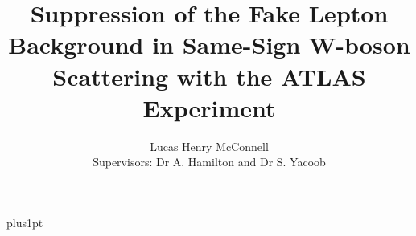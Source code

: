\documentclass[12pt]{ociamthesis}  %
\title{Suppression of the Fake Lepton Background in Same-Sign W-boson Scattering with the ATLAS Experiment}   %
\author{Lucas Henry McConnell\\ \small Supervisors: Dr A. Hamilton and Dr S. Yacoob} %
\begin{document}
\baselineskip=18pt plus1pt
\setcounter{secnumdepth}{3}
\setcounter{tocdepth}{3}

\maketitle                  %

\begin{romanpages}          %
\tableofcontents            %
\listoffigures              %
\end{romanpages}            %





 




\appendix




\printbibliography
%
%
\end{document}
